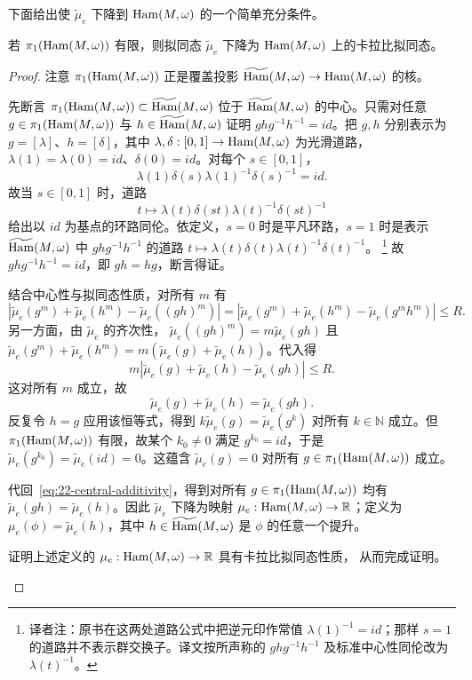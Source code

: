 下面给出使 $\widetilde\mu_e$ 下降到 $\operatorname{Ham}(M,\omega)$ 的一个简单充分条件。

\begin{proposition}
\label{prop:22-descend-calabi-quasimorphism}
若 $\pi_1(\operatorname{Ham}(M,\omega))$ 有限，则拟同态 $\widetilde\mu_e$ 下降为
$\operatorname{Ham}(M,\omega)$ 上的卡拉比拟同态。
\end{proposition}

\begin{proof}
注意 $\pi_1(\operatorname{Ham}(M,\omega))$ 正是覆盖投影
$\widetilde{\operatorname{Ham}}(M,\omega)\to\operatorname{Ham}(M,\omega)$ 的核。

先断言 $\pi_1(\operatorname{Ham}(M,\omega))\subset\widetilde{\operatorname{Ham}}(M,\omega)$ 位于
$\widetilde{\operatorname{Ham}}(M,\omega)$ 的中心。只需对任意
$g\in\pi_1(\operatorname{Ham}(M,\omega))$ 与 $h\in\widetilde{\operatorname{Ham}}(M,\omega)$ 证明
$ghg^{-1}h^{-1}=id$。把 $g,h$ 分别表示为 $g=[\lambda]$、$h=[\delta]$，其中
$\lambda,\delta:[0,1]\to\operatorname{Ham}(M,\omega)$ 为光滑道路，
$\lambda(1)=\lambda(0)=id$、$\delta(0)=id$。对每个 $s\in[0,1]$，
\[
 \lambda(1)\delta(s)\lambda(1)^{-1}\delta(s)^{-1}=id.
\]
故当 $s\in[0,1]$ 时，道路
\[
 t\longmapsto\lambda(t)\delta(st)\lambda(t)^{-1}\delta(st)^{-1}
\]
给出以 $id$ 为基点的环路同伦。依定义，$s=0$ 时是平凡环路，$s=1$ 时是表示
$\widetilde{\operatorname{Ham}}(M,\omega)$ 中 $ghg^{-1}h^{-1}$ 的道路
$t\mapsto\lambda(t)\delta(t)\lambda(t)^{-1}\delta(t)^{-1}$。
\footnote{译者注：原书在这两处道路公式中把逆元印作常值
$\lambda(1)^{-1}=id$；那样 $s=1$ 的道路并不表示群交换子。译文按所声称的
$ghg^{-1}h^{-1}$ 及标准中心性同伦改为 $\lambda(t)^{-1}$。}
故
$ghg^{-1}h^{-1}=id$，即 $gh=hg$，断言得证。

结合中心性与拟同态性质，对所有 $m$ 有
\[
 |\widetilde\mu_e(g^m)+\widetilde\mu_e(h^m)
 -\widetilde\mu_e((gh)^m)|
 =|\widetilde\mu_e(g^m)+\widetilde\mu_e(h^m)
 -\widetilde\mu_e(g^mh^m)|\leq R.
\]
另一方面，由 $\widetilde\mu_e$ 的齐次性，
$\widetilde\mu_e((gh)^m)=m\widetilde\mu_e(gh)$ 且
$\widetilde\mu_e(g^m)+\widetilde\mu_e(h^m)
=m(\widetilde\mu_e(g)+\widetilde\mu_e(h))$。代入得
\[
 m|\widetilde\mu_e(g)+\widetilde\mu_e(h)-\widetilde\mu_e(gh)|\leq R.
\]
这对所有 $m$ 成立，故
\begin{equation}
 \widetilde\mu_e(g)+\widetilde\mu_e(h)=\widetilde\mu_e(gh).
 \label{eq:22-central-additivity}
\end{equation}
反复令 $h=g$ 应用该恒等式，得到
$k\widetilde\mu_e(g)=\widetilde\mu_e(g^k)$ 对所有 $k\in\mathbb N$ 成立。但
$\pi_1(\operatorname{Ham}(M,\omega))$ 有限，故某个 $k_0\neq0$ 满足 $g^{k_0}=id$，于是
$\widetilde\mu_e(g^{k_0})=\widetilde\mu_e(id)=0$。这蕴含
$\widetilde\mu_e(g)=0$ 对所有 $g\in\pi_1(\operatorname{Ham}(M,\omega))$ 成立。

代回~\eqref{eq:22-central-additivity}，得到对所有
$g\in\pi_1(\operatorname{Ham}(M,\omega))$ 均有
$\widetilde\mu_e(gh)=\widetilde\mu_e(h)$。因此 $\widetilde\mu_e$ 下降为映射
$\mu_e:\operatorname{Ham}(M,\omega)\to\mathbb R$；定义为
$\mu_e(\phi)=\widetilde\mu_e(h)$，其中
$h\in\widetilde{\operatorname{Ham}}(M,\omega)$ 是 $\phi$ 的任意一个提升。

\begin{exercise}
\label{exer:22-calabi-quasimorphism-descent}
证明上述定义的 $\mu_e:\operatorname{Ham}(M,\omega)\to\mathbb R$ 具有卡拉比拟同态性质，
从而完成证明。
\end{exercise}
\end{proof}

